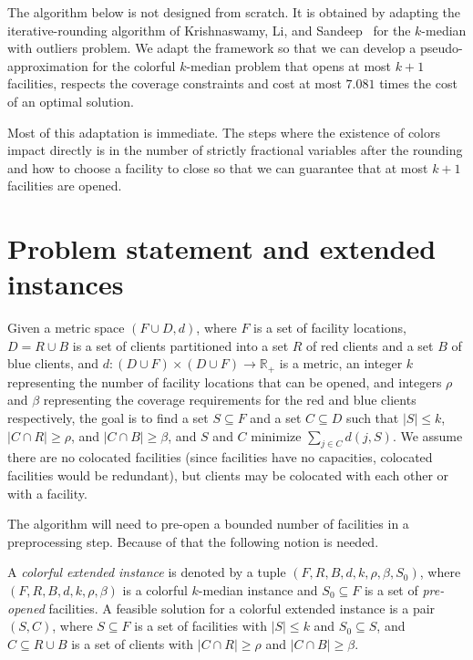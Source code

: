 \documentclass[a4paper,11pt]{article}
\newcommand{\real}{\mathbb{R}}
\begin{document}
The algorithm below is not designed from scratch. It is obtained by
adapting the iterative-rounding algorithm of
Krishnaswamy, Li, and Sandeep~\cite{KLS2018} for the $k$-median with outliers problem. 
We adapt the framework so that we can develop a pseudo-approximation for the colorful $k$-median problem that opens at most $k+1$ facilities, respects the coverage constraints and cost at most $7.081$ times the cost of an optimal solution.

Most of this adaptation is immediate. The steps where the existence of colors impact directly is in the number of strictly fractional variables after the rounding and how to choose a facility to close so that we can guarantee that at most $k + 1$ facilities are opened.

\section{Problem statement and extended instances}

\begin{problem}
Given a metric space $(F \cup D, d)$, where $F$ is a set of facility
locations, $D = R \cup B$ is a set of clients partitioned into a set $R$
of red clients and a set $B$ of blue clients, and $d : (D \cup F) \times
(D \cup F) \to \real_+$ is a metric, an integer $k$ representing the
number of facility locations that can be opened, and integers $\rho$ and
$\beta$ representing the coverage requirements for the red and blue
clients respectively, the goal is to find a set $S \subseteq F$ and a set
$C \subseteq D$ such that $|S| \le k$, $|C \cap R| \geq \rho$, and $|C
\cap B| \geq \beta$, and $S$ and $C$ minimize $\sum_{j \in C} d(j,S)$. We
assume there are no colocated facilities (since facilities have no
capacities, colocated facilities would be redundant), but clients may be
colocated with each other or with a facility.
\end{problem}

The algorithm will need to pre-open a
bounded number of facilities in a preprocessing step. Because of that the following notion is needed.

\begin{definition}
A \emph{colorful extended instance} is denoted by a tuple $(F, R, B, d, k, \rho,
\beta, S_0)$, where $(F,R,B,d,k,\rho,\beta)$ is a colorful $k$-median
instance and $S_0 \subseteq F$ is a set of \emph{pre-opened} facilities.
A feasible solution for a colorful extended instance is a pair $(S,C)$,
where $S \subseteq F$ is a set of facilities with $|S| \leq k$ and $S_0
\subseteq S$, and $C \subseteq R \cup B$ is a set of clients with $|C
\cap R| \geq \rho$ and $|C \cap B| \geq \beta$.
\end{definition}
\end{document}
